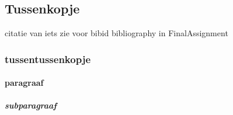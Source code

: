 \subsection{Tussenkopje}
citatie van iets \cite{gitlabwebsite} 
zie voor bibid bibliography in FinalAssignment
\subsubsection{tussentussenkopje}
\paragraph{paragraaf}
\subparagraph{subparagraaf} 


